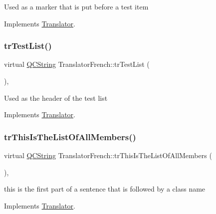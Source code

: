 Used as a marker that is put before a test item 

Implements \mbox{\hyperlink{class_translator}{Translator}}.

\mbox{\label{class_translator_french_a20a6fa4ecf08e2ee975703132af8d663}} 
\subsubsection{\texorpdfstring{trTestList()}{trTestList()}}
{\footnotesize\ttfamily virtual \mbox{\hyperlink{class_q_c_string}{Q\+C\+String}} Translator\+French\+::tr\+Test\+List (\begin{DoxyParamCaption}{ }\end{DoxyParamCaption})\hspace{0.3cm}{\ttfamily [inline]}, {\ttfamily [virtual]}}

Used as the header of the test list 

Implements \mbox{\hyperlink{class_translator}{Translator}}.

\mbox{\label{class_translator_french_a57d28f5f40c4373133de794af6781478}} 
\subsubsection{\texorpdfstring{trThisIsTheListOfAllMembers()}{trThisIsTheListOfAllMembers()}}
{\footnotesize\ttfamily virtual \mbox{\hyperlink{class_q_c_string}{Q\+C\+String}} Translator\+French\+::tr\+This\+Is\+The\+List\+Of\+All\+Members (\begin{DoxyParamCaption}{ }\end{DoxyParamCaption})\hspace{0.3cm}{\ttfamily [inline]}, {\ttfamily [virtual]}}

this is the first part of a sentence that is followed by a class name 

Implements \mbox{\hyperlink{class_translator}{Translator}}.

\mbox{\label{class_translator_french_a83a5ac8f176c3b570dc249a3e55c80f3}} 
